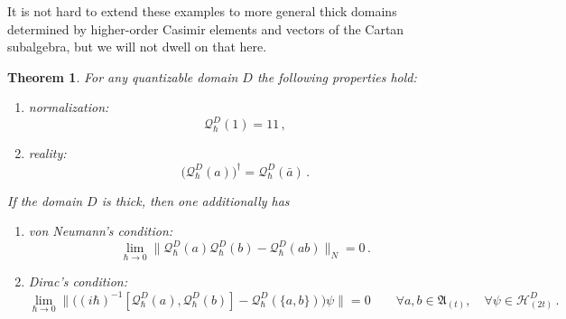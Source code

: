 \documentclass[12pt,a4paper]{article}
\numberwithin{equation}{section}
\theoremstyle{theorem}
\newtheorem{theorem}{Theorem}[]
\theoremstyle{remark}
\newcommand{\hh}{\mathcal{H}}
\newcommand{\fa}{\mathfrak{A}}
\newcommand{\qq}{\mathcal{Q}_{\hbar}}
\newcommand{\I}{1\!\! 1}
\begin{document}
It is not hard to extend these examples to more general thick domains determined by higher-order Casimir elements and vectors of the Cartan subalgebra, but we will not dwell on that here. 
 
\begin{theorem} For any quantizable domain $D$ the following properties hold: 
    \begin{enumerate}
        \item[i)] normalization: 
                      $$\qq^D(1)=\I\,,$$
        \item[ii)] reality: 
        $$\big(\qq^D(a)\big)^\dagger=\qq^D(\bar a)\,.$$
         \end{enumerate}   
         If the domain $D$ is thick,  then one additionally has
         \begin{enumerate}
         \item [iii)] von Neumann's condition: 
         $$  \lim_{\hbar\to 0}\big\|\qq^D(a)\qq^D(b)-\qq^D(ab)\big\|_N=0\,.$$
        \item [iv)] Dirac's condition: 
        $$  \lim_{\hbar\to 0}\big\|\big((i\hbar)^{-1}[\qq^D(a),\qq^D(b)]-\qq^D(\{a,b\})\big)\psi\big\|=0\qquad \forall a,b\in \fa_{(t)},\quad \forall \psi\in \hh^D_{(2t)}\,.$$
        
    \end{enumerate}
      \end{theorem}
\end{document}
